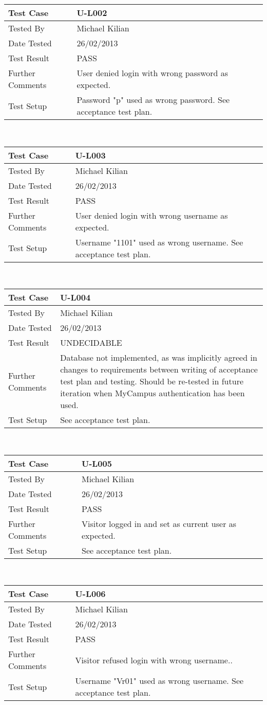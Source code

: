 \documentclass{l3deliverable}
\begin{document}
\begin{tabular}{lp{10cm}}
\hline 
\textbf{Test Case} & U-L002\tabularnewline
\hline 
\hline 
Tested By & Michael Kilian\tabularnewline
\hline 
Date Tested & 26/02/2013\tabularnewline
\hline 
Test Result & PASS\tabularnewline
\hline
Further Comments & User denied login with wrong password as expected. \tabularnewline
\hline
Test Setup & Password "p" used as wrong password. See acceptance test plan. \tabularnewline
\hline
\end{tabular}\\

\begin{tabular}{lp{10cm}}
\hline 
\textbf{Test Case} & U-L003\tabularnewline
\hline 
\hline 
Tested By & Michael Kilian\tabularnewline
\hline 
Date Tested & 26/02/2013\tabularnewline
\hline 
Test Result & PASS\tabularnewline
\hline
Further Comments & User denied login with wrong username as expected. \tabularnewline
\hline
Test Setup & Username "1101" used as wrong username. See acceptance test plan. \tabularnewline
\hline
\end{tabular}\\

\begin{tabular}{lp{10cm}}
\hline 
\textbf{Test Case} & U-L004\tabularnewline
\hline 
\hline 
Tested By & Michael Kilian\tabularnewline
\hline 
Date Tested & 26/02/2013\tabularnewline
\hline 
Test Result & UNDECIDABLE\tabularnewline
\hline
Further Comments & Database not implemented, as was implicitly agreed in changes to requirements between writing of acceptance test plan and testing. Should be re-tested in future iteration when MyCampus authentication has been used. \tabularnewline
\hline
Test Setup & See acceptance test plan. \tabularnewline
\hline
\end{tabular}\\

\begin{tabular}{lp{10cm}}
\hline 
\textbf{Test Case} & U-L005\tabularnewline
\hline 
\hline 
Tested By & Michael Kilian\tabularnewline
\hline 
Date Tested & 26/02/2013\tabularnewline
\hline 
Test Result & PASS\tabularnewline
\hline
Further Comments & Visitor logged in and set as current user as expected. \tabularnewline
\hline
Test Setup & See acceptance test plan. \tabularnewline
\hline
\end{tabular}\\

\begin{tabular}{lp{10cm}}
\hline 
\textbf{Test Case} & U-L006\tabularnewline
\hline 
\hline 
Tested By & Michael Kilian\tabularnewline
\hline 
Date Tested & 26/02/2013\tabularnewline
\hline 
Test Result & PASS\tabularnewline
\hline
Further Comments &  Visitor refused login with wrong username.. \tabularnewline
\hline
Test Setup & Username "Vr01" used as wrong username. See acceptance test plan. \tabularnewline
\hline
\end{tabular}\\
\end{document}
